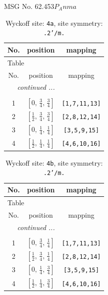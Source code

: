 \documentclass[fleqn,8pt]{jsarticle}
\begin{document}
\setcounter{MaxMatrixCols}{32}

\renewcommand{\tablename}{Table~}
\renewcommand{\figurename}{Figure~}
\begin{center}
\LARGE
MSG No. 62.453\quad$P_{A}nma$
\end{center}
\renewcommand{\arraystretch}{1.2}
\begin{longtable}{ccc}
\caption{Wyckoff site: {\tt 4a}, site symmetry: {\tt .2'/m.}}
 \\
 \hline \hline
No. & position & mapping \\ \hline \endfirsthead

\multicolumn{2}{l}{\tablename\ \thetable{}} \\
 \hline \hline
No. & position & mapping \\ \hline \endhead

 \hline \hline
\multicolumn{2}{r}{\footnotesize\it continued ...} \\ \endfoot

 \hline \hline
\multicolumn{2}{r}{} \\ \endlastfoot

1 & $\left[ 0,\, \frac{3}{4},\, \frac{3}{4} \right]$ & {\tt [1,7,11,13]} \\ \hline
2 & $\left[ \frac{1}{2},\, \frac{3}{4},\, \frac{3}{4} \right]$ & {\tt [2,8,12,14]} \\ \hline
3 & $\left[ 0,\, \frac{1}{4},\, \frac{1}{4} \right]$ & {\tt [3,5,9,15]} \\ \hline
4 & $\left[ \frac{1}{2},\, \frac{1}{4},\, \frac{1}{4} \right]$ & {\tt [4,6,10,16]} \\
\end{longtable}
\renewcommand{\arraystretch}{1.2}
\begin{longtable}{ccc}
\caption{Wyckoff site: {\tt 4b}, site symmetry: {\tt .2'/m.}}
 \\
 \hline \hline
No. & position & mapping \\ \hline \endfirsthead

\multicolumn{2}{l}{\tablename\ \thetable{}} \\
 \hline \hline
No. & position & mapping \\ \hline \endhead

 \hline \hline
\multicolumn{2}{r}{\footnotesize\it continued ...} \\ \endfoot

 \hline \hline
\multicolumn{2}{r}{} \\ \endlastfoot

1 & $\left[ 0,\, \frac{3}{4},\, \frac{1}{4} \right]$ & {\tt [1,7,11,13]} \\ \hline
2 & $\left[ \frac{1}{2},\, \frac{3}{4},\, \frac{1}{4} \right]$ & {\tt [2,8,12,14]} \\ \hline
3 & $\left[ 0,\, \frac{1}{4},\, \frac{3}{4} \right]$ & {\tt [3,5,9,15]} \\ \hline
4 & $\left[ \frac{1}{2},\, \frac{1}{4},\, \frac{3}{4} \right]$ & {\tt [4,6,10,16]} \\
\end{longtable}
\end{document}
